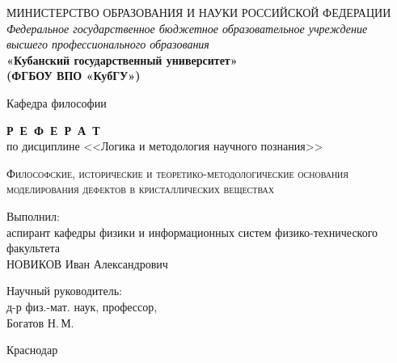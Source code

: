 \documentclass[a4paper, 14pt, titlepage]{extarticle}
\author{\theauthor,\\ кафедра физики и информационных систем КубГУ}
\title{\thetitle}
\date{\today{} \currenttime}
\newcommand{\thetitle}{Философские, исторические и теоретико-методологические основания
  моделирования дефектов в кристаллических веществах}
\begin{document}

  \thispagestyle{empty}
  \begin{center}
  \begin{spacing}{1.0}
  {\small МИНИСТЕРСТВО ОБРАЗОВАНИЯ И НАУКИ РОССИЙСКОЙ ФЕДЕРАЦИИ\\
  \textit{Федеральное государственное бюджетное образовательное учреждение\\
  высшего профессионального образования}}\\
  \textbf{\large«Кубанский государственный университет»\\
  (ФГБОУ ВПО «КубГУ»)}

  \vspace {5mm}

  Кафедра философии

  \vspace {4cm}

  \textbf{\large Р~Е~Ф~Е~Р~А~Т}\\
  по дисциплине <<Логика и методология научного познания>>

  \vspace {0.5cm}

  { \scshape \thetitle }

  \vspace {1.5cm}

  \hfill\begin{minipage}{0.63\textwidth}
    Выполнил:\\
    аспирант кафедры физики и информационных систем
    физико-технического факультета\\
    НОВИКОВ Иван Александрович
    \vspace{1cm}

    Научный руководитель:\\
    д-р физ.-мат. наук, профессор,\\
    Богатов Н.\,М.
  \end{minipage}

  \vfill

  Краснодар \the\year
  \end{spacing}
  \end{center}


    \clearpage
    \tableofcontents


  \label{sec:intro}
\end{document}
